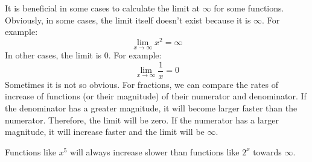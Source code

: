 \documentclass[../revisedMain.tex]{subfiles}
\begin{document}
	    It is beneficial in some cases to calculate the limit at $\infty$ for some functions. Obviously, in some cases, the limit itself doesn't exist because it is $\infty$. For example: $$\lim_{x\to\infty} x^2 = \infty$$ In other cases, the limit is 0. For example: $$\lim_{x\to\infty} \frac{1}{x}=0$$
	    Sometimes it is not so obvious. For fractions, we can compare the rates of increase of functions (or their magnitude) of their numerator and denominator. If the denominator has a greater magnitude, it will become larger faster than the numerator. Therefore, the limit will be zero. If the numerator has a larger magnitude, it will increase faster and the limit will be $\infty$. 
	    \begin{center}
	    \newline
	    Functions like $x^5$ will always increase slower than functions like $2^x$ towards $\infty$.
	\end{center}
\end{document}
